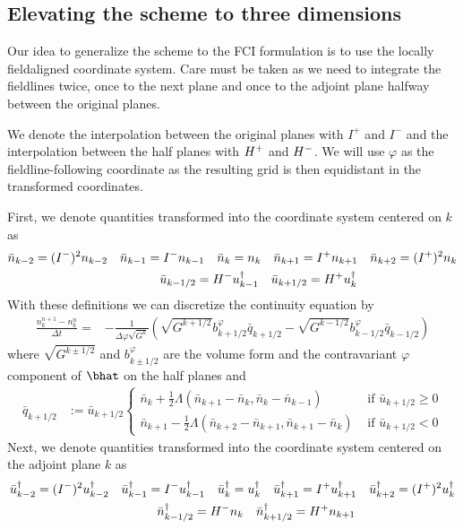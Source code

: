\subsection{Elevating the scheme to three dimensions}
Our idea to generalize the scheme to the FCI formulation is to use the
locally fieldaligned coordinate system.
Care must be taken as we need to integrate the fieldlines twice, once to the
next plane and once to the adjoint plane halfway between the original planes.

We denote the interpolation between the original planes with $I^+$ and $I^-$ and
the interpolation between the half planes with $H^+$ and $H^-$.
We will use $\varphi$ as the fieldline-following coordinate as the resulting
grid is then equidistant in the transformed coordinates.

First, we denote quantities transformed into the coordinate system centered on $k$ as
\begin{align}
    \bar n_{k-2} = (I^-)^2n_{k-2} \quad \bar n_{k-1} = I^- n_{k-1}
    \quad \bar n_k = n_k \quad
    \bar n_{k+1} = I^+n_{k+1} \quad \bar n_{k+2} = (I^+)^2 n_k \nonumber\\
\bar u_{k-1/2} = H^- u_{k-1}^\dagger \quad \bar u_{k+1/2} = H^+ u_k^\dagger \qquad\qquad\qquad\qquad
\end{align}
With these definitions we can discretize the continuity equation by
\begin{align}
    \frac{n_k^{n+1} - n_k^n}{\Delta t} = &-\frac{1}{\Delta\varphi \sqrt{G^k}}
    \left( \sqrt{G^{k+1/2}}b^\varphi_{k+1/2}  \bar q_{k+1/2}
    -\sqrt{G^{k-1/2}}b^\varphi_{k-1/2}  \bar q_{k-1/2} \right)
\end{align}
where $\sqrt{G^{k\pm 1/2}}$ and $b^\varphi_{k\pm 1/2}$ are the volume form and
the contravariant $\varphi$ component of $\bhat$ on the half planes and
\begin{align}
    \bar q_{k+1/2} &:= \bar u_{k+1/2} \begin{cases}
        \bar n_k     + \frac{1}{2}\Lambda( \bar n_{k+1}-\bar n_k    , \bar n_k - \bar n_{k-1})&\text{ if } \bar u_{k+1/2} \geq 0 \\
        \bar n_{k+1} - \frac{1}{2}\Lambda( \bar n_{k+2}-\bar n_{k+1}, \bar n_{k+1} - \bar n_k)&\text{ if } \bar u_{k+1/2} < 0
    \end{cases}
\end{align}
Next, we denote quantities transformed into the coordinate system centered on the adjoint plane $k$ as
\begin{align}
    \bar u^\dagger_{k-2} = (I^-)^2u^\dagger_{k-2} \quad \bar u^\dagger_{k-1} = I^- u^\dagger_{k-1}
    \quad \bar u^\dagger_k = u^\dagger_k \quad
    \bar u^\dagger_{k+1} = I^+u^\dagger_{k+1} \quad \bar u^\dagger_{k+2} = (I^+)^2 u^\dagger_k \nonumber\\
    \bar n^\dagger_{k-1/2} = H^- n_{k} \quad \bar n^\dagger_{k+1/2} = H^+ n_{k+1} \qquad\qquad\qquad\qquad
\end{align}
